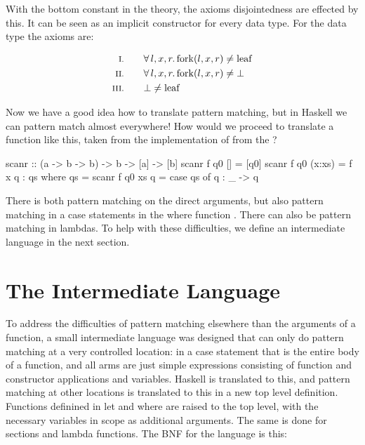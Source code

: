 With the bottom constant in the theory, the axioms disjointedness are
effected by this. It can be seen as an implicit constructor for every
data type. For the  data type the axioms are:

\begin{align*}
\rom{1} \qquad & \faaa{l}{x}{r} \fn{fork}(l,x,r) \neq \fn{leaf} \\
\rom{2} \qquad & \faaa{l}{x}{r} \fn{fork}(l,x,r) \neq \bot      \\
\rom{3} \qquad & \bot \neq \fn{leaf}
\end{align*}

Now we have a good idea how to translate pattern matching, but
in Haskell we can pattern match almost everywhere! How would we
proceed to translate a function like this, taken from the
implementation of  from the ?

\begin{code}
scanr             :: (a -> b -> b) -> b -> [a] -> [b]
scanr f q0 []     =  [q0]
scanr f q0 (x:xs) =  f x q : qs
                     where qs = scanr f q0 xs
                           q = case qs of
                                 q : _ -> q
\end{code}

\noindent
There is both pattern matching on the direct arguments, but also
pattern matching in a case statements in the where function
. There can also be pattern matching in lambdas. To help with
these difficulties, we define an intermediate language in the next
section.

\section{The Intermediate Language}

To address the difficulties of pattern matching elsewhere than the
arguments of a function, a small intermediate language was designed
that can only do pattern matching at a very controlled location: in a
case statement that is the entire body of a function, and all arms are
just simple expressions consisting of function and constructor
applications and variables. Haskell is translated to this, and pattern
matching at other locations is translated to this in a new top level
definition. Functions definined in let and where are raised to the top
level, with the necessary variables in scope as additional
arguments. The same is done for sections and lambda functions. The BNF
for the language is this:

